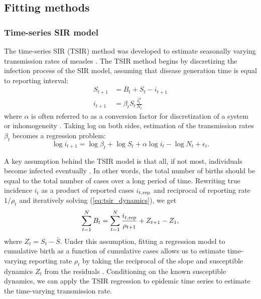 \documentclass{article}
\newcommand{\eref}[1]{(\ref{eq:#1})}
\begin{document}
\subsection{Fitting methods}

\subsubsection*{Time-series SIR model}

The time-series SIR (TSIR) method was developed to estimate seasonally varying transmission rates of measles \citep{finkenstadt2000time}.
The TSIR method begins by discretizing the infection process of the SIR model, assuming that disease generation time is equal to reporting interval:
\begin{equation}\label{eq:tsir_dynamics}
\begin{aligned}
S_{t+1} &= B_t + S_t - i_{t+1}\\
i_{t+1} &= \beta_t S_t \frac{i_t^\alpha}{N_t}
\end{aligned}
\end{equation}
where $\alpha$ is often referred to as a conversion factor for discretization of a system or inhomogeneity \citep{liu1986influence, bjornstad2002dynamics, glass2003interpreting}.
Taking log on both sides, estimation of the transmission rates $\beta_t$ becomes a regression problem:
\begin{equation}\label{eq:tsir}
\log i_{t + 1} = \log \beta_t + \log S_t + \alpha \log i_t - \log N_t + \epsilon_t.
\end{equation}

A key assumption behind the TSIR model is that all, if not most, individuals become infected eventually \citep{finkenstadt2000time}.
In other words, the total number of births should be equal to the total number of cases over a long period of time.
Rewriting true incidence $i_t$ as a product of reported cases $i_{t, {\tiny \textrm{rep}}}$ and reciprocal of reporting rate $1/\rho_t$ and iteratively solving \eref{tsir_dynamics}, we get
\begin{equation}
\sum_{t=1}^N B_t = \sum_{t=1}^N \frac{i_{t, {\tiny \textrm{rep}}}}{\rho_{t+1}} + Z_{t+1} - Z_1,
\end{equation}
where $Z_t = S_t - \bar{S}$.
Under this assumption, fitting a regression model to cumulative birth as a function of cumulative cases allows us to estimate time-varying reporting rate $\rho_t$ by taking the reciprocal of the slope and susceptible dynamics $Z_t$ from the residuals \citep{finkenstadt2000time}.
Conditioning on the known susceptible dynamics, we can apply the TSIR regression \label{eq:tsir} to epidemic time series to estimate the time-varying transmission rate.
\end{document}

